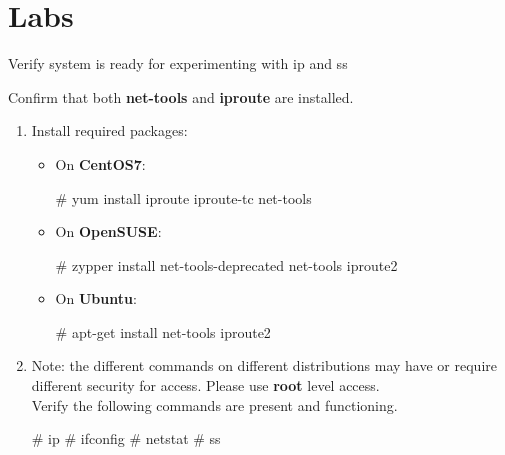 \clearpage\section{Labs}\begin{Lab}

	\begin{exe} {Verify system is ready for experimenting with ip and ss} 

	Confirm that both \textbf{net-tools} and \textbf{iproute} are installed. 


   \begin{sol}
      \begin{enumerate}
	  \item Install required packages:		      
         \begin{itemize}
            \item
            On \textbf{CentOS7}:
            \begin{raw}
# yum install iproute iproute-tc net-tools  
	    \end{raw}
            \item
            On \textbf{OpenSUSE}:
            \begin{raw}
# zypper install net-tools-deprecated net-tools iproute2  
            \end{raw}
            \item
            On \textbf{Ubuntu}:
            \begin{raw}
# apt-get install net-tools iproute2  
            \end{raw}
         \end{itemize}

         \item
	Note: the different commands on different distributions may have or 
		      require different security for access. Please use \textbf{root} 
		      level access. \\

         Verify the following commands are present and functioning.


         \begin{raw}
# ip 
# ifconfig 
# netstat 
# ss 
	 \end{raw}


\end{enumerate}
\end{sol}
\end{exe}
\end{Lab}
